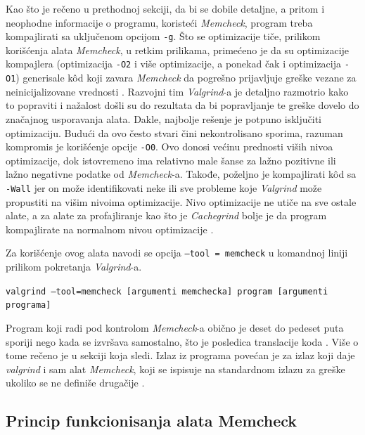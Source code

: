 \documentclass[12pt,oneside]{memoir}
\theoremstyle{plain}
\theoremstyle{definition}
\begin{document}
Kao što je rečeno u prethodnoj sekciji, da bi se dobile detaljne, a pritom i neophodne informacije o programu, koristeći \textit{Memcheck}, program treba kompajlirati sa uključenom opcijom \texttt{-g}. Što se optimizacije tiče, prilikom korišćenja alata \textit{Memcheck}, u retkim prilikama, primećeno je da su optimizacije kompajlera (optimizacija \texttt{-O2} i više optimizacije, a ponekad čak i optimizacija \texttt{-O1}) generisale k\^od koji zavara \textit{Memcheck} da pogrešno prijavljuje greške vezane za neinicijalizovane vrednosti \cite{ValgrindCore}. Razvojni tim \textit{Valgrind}-a je detaljno razmotrio kako to popraviti i nažalost došli su do rezultata da bi popravljanje te greške dovelo do značajnog usporavanja alata. Dakle, najbolje rešenje je potpuno isključiti optimizaciju. Budući da ovo često stvari čini nekontrolisano sporima, razuman kompromis je korišćenje opcije \texttt{-O0}. Ovo donosi većinu prednosti viših nivoa optimizacije, dok istovremeno ima relativno male šanse za lažno pozitivne ili lažno negativne podatke od \textit{Memcheck}-a. Takođe, poželjno je kompajlirati k\^od sa \texttt{-Wall} jer on može identifikovati neke ili sve probleme koje \textit{Valgrind} može propustiti na višim nivoima optimizacije. Nivo optimizacije ne utiče na sve ostale alate, a za alate za profajliranje kao što je \textit{Cachegrind} bolje je da program kompajlirate na normalnom nivou optimizacije \cite{ValgrindCore}. 


Za korišćenje ovog alata navodi se opcija \texttt{--tool = memcheck} u komandnoj liniji prilikom pokretanja \textit{Valgrind}-a.
 \begin{center}
\texttt{valgrind –tool=memcheck [argumenti memchecka] program [argumenti programa]}
\end{center}

Program koji radi pod kontrolom \textit{Memcheck}-a obično je deset do pedeset puta sporiji nego kada se izvršava samostalno, što je posledica translacije koda \cite{ValgrindCore}. Više o tome rečeno je u sekciji koja sledi. Izlaz iz programa povećan je za izlaz koji daje \textit{valgrind} i sam alat \textit{Memcheck}, koji se ispisuje na standardnom izlazu za greške ukoliko se ne definiše drugačije \cite{ValgrindDOC}. 

\subsection{Princip funkcionisanja alata Memcheck}
\end{document}

